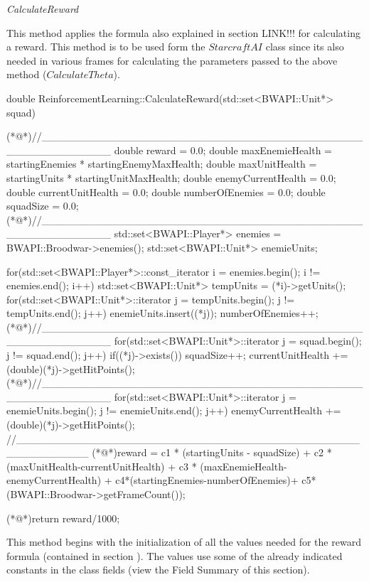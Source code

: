 \begin{flushleft}
\textit{CalculateReward}
 \end{flushleft}
 
 This method applies the formula also explained in section LINK!!! for calculating a reward. This method is to be used form the $StarcraftAI$ class since its also needed in various frames for calculating the parameters passed to the above method ($CalculateTheta$).\\

\begin{Sourcecode}[caption=CalculateReward Method]
double ReinforcementLearning::CalculateReward(std::set<BWAPI::Unit*> squad)
{
(*@\lnote@*)//_________________________________________________________	
	double reward = 0.0;
	double maxEnemieHealth = startingEnemies * startingEnemyMaxHealth;
	double maxUnitHealth = startingUnits * startingUnitMaxHealth;
	double enemyCurrentHealth = 0.0;
	double currentUnitHealth = 0.0;
	double numberOfEnemies = 0.0;
	double squadSize = 0.0;
(*@\lnote@*)//_________________________________________________________
	std::set<BWAPI::Player*> enemies = BWAPI::Broodwar->enemies();	
	std::set<BWAPI::Unit*> enemieUnits;

	for(std::set<BWAPI::Player*>::const_iterator i = enemies.begin(); i != enemies.end(); i++)
	{
		std::set<BWAPI::Unit*> tempUnits = (*i)->getUnits();
		for(std::set<BWAPI::Unit*>::iterator j = tempUnits.begin(); j != tempUnits.end(); j++)
		{
			enemieUnits.insert((*j));
			numberOfEnemies++;
		}
	}
(*@\lnote@*)//_________________________________________________________
	for(std::set<BWAPI::Unit*>::iterator j = squad.begin(); j != squad.end(); j++)
	{
		if((*j)->exists()) squadSize++;
		currentUnitHealth += (double)(*j)->getHitPoints();
	}
(*@\lnote@*)//_________________________________________________________
	for(std::set<BWAPI::Unit*>::iterator j = enemieUnits.begin(); j != enemieUnits.end(); j++)
	{
		enemyCurrentHealth += (double)(*j)->getHitPoints();
	}	
//_________________________________________________________
	(*@\lnote@*)reward = c1 * (startingUnits - squadSize) + c2 * (maxUnitHealth-currentUnitHealth) + c3 * (maxEnemieHealth-enemyCurrentHealth) + c4*(startingEnemies-numberOfEnemies)+ c5*(BWAPI::Broodwar->getFrameCount());
	
	(*@\lnote@*)return reward/1000;
}
\end{Sourcecode}

This method begins with the initialization of all the values needed for the reward formula (contained in section ). The values use some of the already indicated constants in the class fields (view the Field Summary of this section). \\

